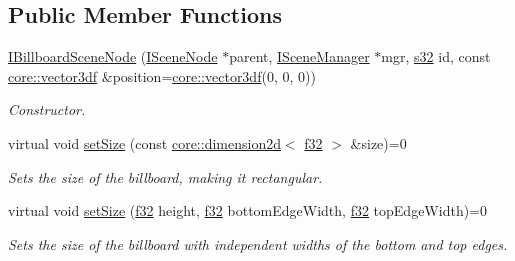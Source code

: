 \subsection*{Public Member Functions}
\begin{DoxyCompactItemize}
\item 
\mbox{\label{classirr_1_1scene_1_1IBillboardSceneNode_a32225fb98ab8f9e472272ae9e83c3c88}} 
\hyperlink{classirr_1_1scene_1_1IBillboardSceneNode_a32225fb98ab8f9e472272ae9e83c3c88}{I\+Billboard\+Scene\+Node} (\hyperlink{classirr_1_1scene_1_1ISceneNode}{I\+Scene\+Node} $\ast$parent, \hyperlink{classirr_1_1scene_1_1ISceneManager}{I\+Scene\+Manager} $\ast$mgr, \hyperlink{namespaceirr_ac66849b7a6ed16e30ebede579f9b47c6}{s32} id, const \hyperlink{namespaceirr_1_1core_ae6e2b2a6c552833ebbd5b7463d03586b}{core\+::vector3df} \&position=\hyperlink{namespaceirr_1_1core_ae6e2b2a6c552833ebbd5b7463d03586b}{core\+::vector3df}(0, 0, 0))
\begin{DoxyCompactList}\small\item\em Constructor. \end{DoxyCompactList}\item 
\mbox{\label{classirr_1_1scene_1_1IBillboardSceneNode_a911415ac24440bd3ccfcde102583fd60}} 
virtual void \hyperlink{classirr_1_1scene_1_1IBillboardSceneNode_a911415ac24440bd3ccfcde102583fd60}{set\+Size} (const \hyperlink{classirr_1_1core_1_1dimension2d}{core\+::dimension2d}$<$ \hyperlink{namespaceirr_a0277be98d67dc26ff93b1a6a1d086b07}{f32} $>$ \&size)=0
\begin{DoxyCompactList}\small\item\em Sets the size of the billboard, making it rectangular. \end{DoxyCompactList}\item 
virtual void \hyperlink{classirr_1_1scene_1_1IBillboardSceneNode_a9a5d47a00bb0160daab8fa53453a2ba4}{set\+Size} (\hyperlink{namespaceirr_a0277be98d67dc26ff93b1a6a1d086b07}{f32} height, \hyperlink{namespaceirr_a0277be98d67dc26ff93b1a6a1d086b07}{f32} bottom\+Edge\+Width, \hyperlink{namespaceirr_a0277be98d67dc26ff93b1a6a1d086b07}{f32} top\+Edge\+Width)=0
\begin{DoxyCompactList}\small\item\em Sets the size of the billboard with independent widths of the bottom and top edges. \end{DoxyCompactList}\item 

\end{DoxyCompactItemize}
